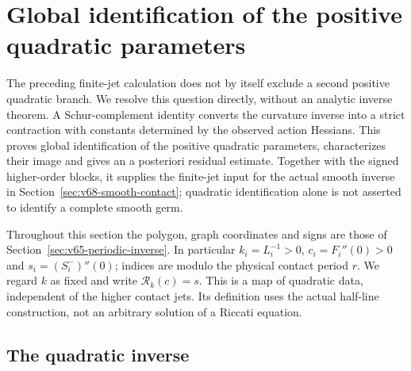 \section{Global identification of the positive quadratic parameters}
\label{sec:v66-global-contact}

The preceding finite-jet calculation does not by itself exclude a second
positive quadratic branch.  We resolve this question directly, without
an analytic inverse theorem.  A Schur-complement identity converts the
curvature inverse into a strict contraction with constants determined
by the observed action Hessians.  This proves global identification of
the positive quadratic parameters, characterizes their image and gives
an a posteriori residual estimate.  Together with the signed higher-order
blocks, it supplies the finite-jet input for the actual smooth inverse
in Section~\ref{sec:v68-smooth-contact}; quadratic identification alone
is not asserted to identify a complete smooth germ.

Throughout this section the polygon, graph coordinates and signs are
those of Section~\ref{sec:v65-periodic-inverse}.  In particular
$k_i=L_i^{-1}>0$, $c_i=F_i''(0)>0$ and $s_i=(S_i^-)''(0)$;
indices are modulo the physical contact period $r$.  We regard $k$ as
fixed and write $\mathcal R_k(c)=s$.  This is a map of quadratic data,
independent of the higher contact jets.  Its definition uses the actual
half-line construction, not an arbitrary solution of a Riccati equation.

\subsection{The quadratic inverse}


